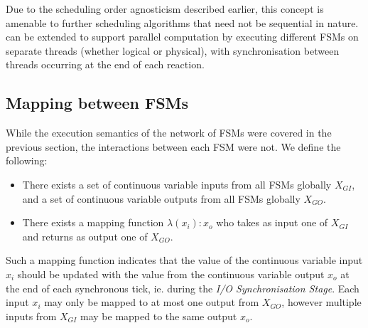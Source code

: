 Due to the scheduling order agnosticism described earlier, this concept is 
amenable to further scheduling algorithms that need not be sequential in 
nature.  \ourTool can be extended to support parallel computation by executing 
different \acp{FSM} on separate threads (whether logical or physical), with 
synchronisation between threads occurring at the end of each reaction.

\subsection{Mapping between \acp{FSM}}
\label{sec:mapping}

While the execution semantics of the network of \acp{FSM} were covered in the 
previous section, the interactions between each \ac{FSM} were not.  We define 
the following:
\begin{itemize}
	\item There exists a set of continuous variable inputs from all \acp{FSM} 
	globally $X_{GI}$, and a set of continuous variable outputs from all 
	\acp{FSM} globally $X_{GO}$.
	\item There exists a mapping function $\lambda(x_i) : x_o$ who takes as 
	input one of $X_{GI}$ and returns as output one of $X_{GO}$.
\end{itemize}

Such a mapping function indicates that the value of the continuous variable 
input $x_i$ should be updated with the value from the continuous variable 
output $x_o$ at the end of each synchronous tick, ie. during the \emph{I/O 
Synchronisation Stage}.  Each input $x_i$ may only be mapped to at most one 
output from $X_{GO}$, however multiple inputs from $X_{GI}$ may be mapped to 
the same output $x_o$.
